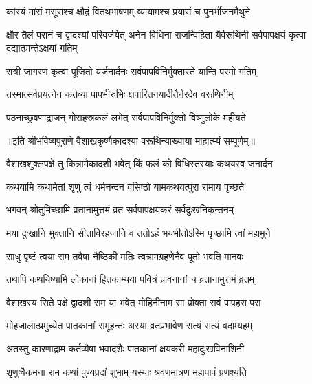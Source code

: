 \twolineshloka
{कांस्यं मांसं मसूरांश्च क्षौद्रं वितथभाषणम्}
{व्यायामश्च प्रयासं च पुनर्भोजनमैथुने} %


\threelineshloka
{क्षौर तैलं परानं च द्वादश्यां परिवर्जयेत्}
{अनेन विधिना राजन्विहिता यैर्वरूथिनी}
{सर्वपापक्षयं कृत्वा दद्यात्प्रान्तेऽक्षयां गतिम्} %

\twolineshloka
{रात्री जागरणं कृत्वा पूजितो यर्जनार्दनः}
{सर्वपापविनिर्मुक्तास्ते यान्ति परमो गतिम्} %

\twolineshloka
{तस्मात्सर्वप्रयत्नेन कर्तव्या पापभीरुभिः}
{क्षपारितनयादीतैर्नरदेव वरूथिनीम्} %

\twolineshloka
{पठनाच्छ्रवणाद्राजन् गोसहस्रकलं लभेत्}
{सर्वपापविनिर्मुक्तो विष्णुलोके महीयते} %

॥इति श्रीभविष्यपुराणे वैशाखकृष्णैकादश्या वरूथिन्याख्याया माहात्म्यं सम्पूर्णम्॥



\twolineshloka
{वैशाखशुक्लपक्षे तु किन्नामैकादशी भवेत्}
{किं फलं को विधिस्तस्याः कथयस्व जनार्दन} %


\twolineshloka
{कथयामि कथामेतां शृणु त्वं धर्मनन्दन}
{वसिष्ठो यामकथयत्पुरा रामाय पृच्छते} %


\twolineshloka
{भगवन् श्रोतुमिच्छामि व्रतानामुत्तमं व्रत}
{सर्वपापक्षयकरं सर्वदुःखनिकृन्तनम्} %

\twolineshloka
{मया दुःखानि भुक्तानि सीताविरहजानि व}
{ततोऽहं भयभीतोऽस्मि पृच्छामि त्वां महामुने} %


\twolineshloka
{साधु पृष्टं त्वया राम तवैषा नैष्ठिकी मतिः}
{त्वन्नामग्रहणेनैव पूतो भवति मानवः} %

\twolineshloka
{तथापि कथयिष्यामि लोकानां हितकाम्यया}
{पवित्रं प्रावनानां च व्रतानामुत्तमं व्रतम्} %

\twolineshloka
{वैशाखस्य सिते पक्षे द्वादशी राम या भवेत्}
{मोहिनीनाम सा प्रोक्ता सर्व पापहरा परा} %

\twolineshloka
{मोहजालात्प्रमुच्येत पातकानां समूहन्तः}
{अस्या व्रतप्रभावेण सत्यं सत्यं वदाम्यहम्} %

\twolineshloka
{अतस्तु कारणाद्राम कर्तव्यैषा भवादशैः}
{पातकानां क्षयकरी महादुःखविनाशिनी} %

\twolineshloka
{शृणुष्वैकमना राम कथां पुण्यप्रदां शुभाम्}
{यस्याः श्रवणमात्रण महापापं प्रणश्यति} %

